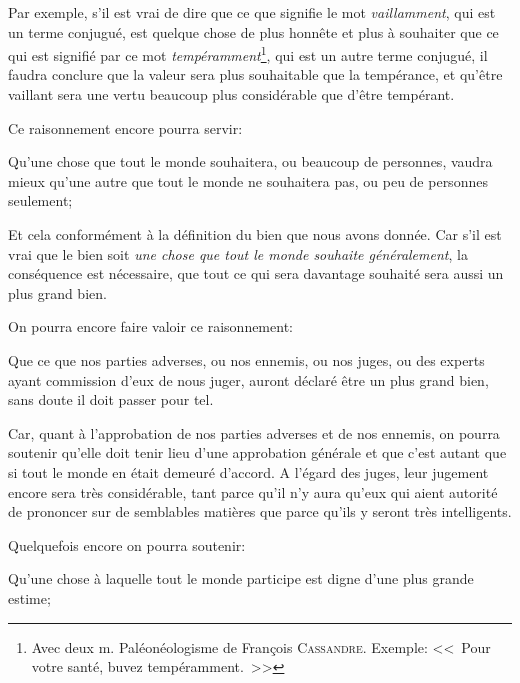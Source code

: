 Par exemple, s'il est vrai de dire que ce que signifie le mot \emph{vaillamment}, qui est un terme conjugué, est
quelque chose de plus honnête et plus à souhaiter que ce qui est signifié par ce mot \emph{tempéramment}\footnote{
Avec deux m. Paléonéologisme de François \textsc{Cassandre}. Exemple: <<~Pour votre santé, buvez tempéramment.~>>},
qui est un autre terme conjugué, il faudra conclure que la valeur sera plus souhaitable que la tempérance, et qu'être
vaillant sera une vertu beaucoup plus considérable que d'être tempérant.

\bigbreak

Ce raisonnement encore pourra servir:

\begin{lieu}
	Qu'une chose que tout le monde souhaitera, ou beaucoup de personnes, vaudra mieux qu'une autre que tout le monde ne
	souhaitera pas, ou peu de personnes seulement;
\end{lieu}

Et cela conformément à la définition du bien que nous avons donnée. Car s'il est vrai que le bien soit \emph{une chose
que tout le monde souhaite généralement}, la conséquence est nécessaire, que tout ce qui sera davantage souhaité sera
aussi un plus grand bien.

\bigbreak

On pourra encore faire valoir ce raisonnement:

\begin{lieu}
	Que ce que nos parties adverses, ou nos ennemis, ou nos juges, ou des experts ayant commission d'eux de nous juger,
	auront déclaré être un plus grand bien, sans doute il doit passer pour tel.
\end{lieu}

Car, quant à l'approbation de nos parties adverses et de nos ennemis, on pourra soutenir qu'elle doit tenir lieu d'une
approbation générale et que c'est autant que si tout le monde en était demeuré d'accord. A l'égard des juges, leur jugement
encore sera très considérable, tant parce qu'il n'y aura qu'eux qui aient autorité de prononcer sur de semblables matières
que parce qu'ils y seront très intelligents.

\bigbreak

Quelquefois encore on pourra soutenir:

\begin{lieu}
	Qu'une chose à laquelle tout le monde participe est digne d'une plus grande estime;
\end{lieu}

